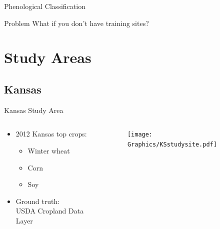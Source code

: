 \documentclass[draft,compress]{beamer}
\begin{document}
\begin{frame}{Phenological Classification}
\begin{alertblock}{Problem}
  What if you don’t have training sites?
\end{alertblock}
\end{frame}


\section{Study Areas}

\subsection{Kansas}
\begin{frame}{Kansas Study Area}
\begin{columns}[onlytextwidth]
\begin{column}{0.47\textwidth}
  \begin{itemize}
    \item 2012 Kansas top crops:
      \begin{itemize}
        \item Winter wheat
        \item Corn
        \item Soy
      \end{itemize}
    \item Ground truth:\\USDA Cropland Data Layer
  \end{itemize}
\end{column}
\begin{column}{0.53\textwidth}
  \begin{figure}
    \texttt{[image: Graphics/KSstudysite.pdf]}
  \end{figure}
\end{column}
\end{columns}
\end{frame}
\end{document}
